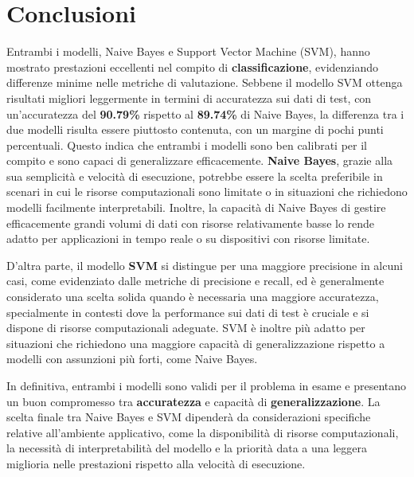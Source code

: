 \section{Conclusioni}

Entrambi i modelli, Naive Bayes e Support Vector Machine (SVM), hanno mostrato prestazioni eccellenti nel compito di \textbf{classificazione}, evidenziando differenze minime nelle metriche di valutazione. Sebbene il modello SVM ottenga risultati migliori leggermente in termini di accuratezza sui dati di test, con un'accuratezza del \textbf{90.79\%} rispetto al \textbf{89.74\%} di Naive Bayes, la differenza tra i due modelli risulta essere piuttosto contenuta, con un margine di pochi punti percentuali. Questo indica che entrambi i modelli sono ben calibrati per il compito e sono capaci di generalizzare efficacemente. \newline
\textbf{Naive Bayes}, grazie alla sua semplicità e velocità di esecuzione, potrebbe essere la scelta preferibile in scenari in cui le risorse computazionali sono limitate o in situazioni che richiedono modelli facilmente interpretabili. Inoltre, la capacità di Naive Bayes di gestire efficacemente grandi volumi di dati con risorse relativamente basse lo rende adatto per applicazioni in tempo reale o su dispositivi con risorse limitate.

D'altra parte, il modello \textbf{SVM} si distingue per una maggiore precisione in alcuni casi, come evidenziato dalle metriche di precisione e recall, ed è generalmente considerato una scelta solida quando è necessaria una maggiore accuratezza, specialmente in contesti dove la performance sui dati di test è cruciale e si dispone di risorse computazionali adeguate. SVM è inoltre più adatto per situazioni che richiedono una maggiore capacità di generalizzazione rispetto a modelli con assunzioni più forti, come Naive Bayes.

In definitiva, entrambi i modelli sono validi per il problema in esame e presentano un buon compromesso tra \textbf{accuratezza} e capacità di \textbf{generalizzazione}. La scelta finale tra Naive Bayes e SVM dipenderà da considerazioni specifiche relative all'ambiente applicativo, come la disponibilità di risorse computazionali, la necessità di interpretabilità del modello e la priorità data a una leggera miglioria nelle prestazioni rispetto alla velocità di esecuzione.